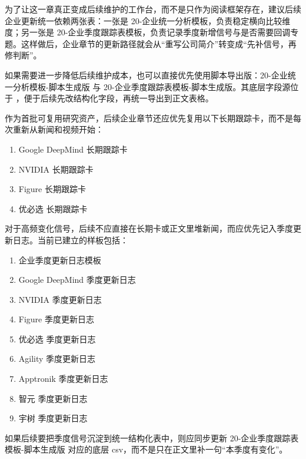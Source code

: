 为了让这一章真正变成后续维护的工作台，而不是只作为阅读框架存在，建议后续企业更新统一依赖两张表：一张是 20-企业统一分析模板，负责稳定横向比较维度；另一张是 20-企业季度跟踪表模板，负责记录季度新增信号与是否需要回调专题。这样做后，企业章节的更新路径就会从“重写公司简介”转变成“先补信号，再修判断”。

如果需要进一步降低后续维护成本，也可以直接优先使用脚本导出版：20-企业统一分析模板-脚本生成版 与 20-企业季度跟踪表模板-脚本生成版。其底层字段源位于 ，便于后续先改结构化字段，再统一导出到正文表格。

作为首批可复用研究资产，后续企业章节还应优先复用以下长期跟踪卡，而不是每次重新从新闻和视频开始：

\begin{enumerate}
\item Google DeepMind 长期跟踪卡
\item NVIDIA 长期跟踪卡
\item Figure 长期跟踪卡
\item 优必选 长期跟踪卡
\end{enumerate}

对于高频变化信号，后续不应直接在长期卡或正文里堆新闻，而应优先记入季度更新日志。当前已建立的样板包括：

\begin{enumerate}
\item 企业季度更新日志模板
\item Google DeepMind 季度更新日志
\item NVIDIA 季度更新日志
\item Figure 季度更新日志
\item 优必选 季度更新日志
\item Agility 季度更新日志
\item Apptronik 季度更新日志
\item 智元 季度更新日志
\item 宇树 季度更新日志
\end{enumerate}

如果后续要把季度信号沉淀到统一结构化表中，则应同步更新 20-企业季度跟踪表模板-脚本生成版 对应的底层 csv，而不是只在正文里补一句“本季度有变化”。
